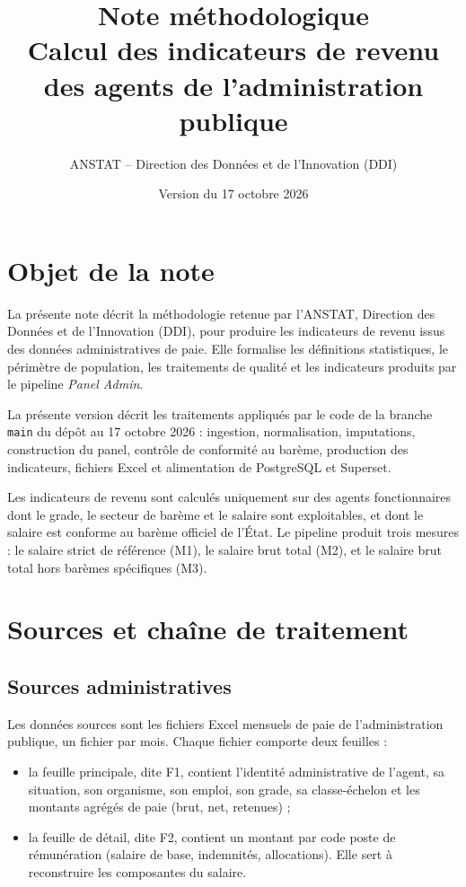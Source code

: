 \documentclass[12pt,a4paper,french]{article}
\title{Note méthodologique\\Calcul des indicateurs de revenu des agents de l'administration publique}
\author{ANSTAT -- Direction des Données et de l'Innovation (DDI)}
\date{Version du 17 octobre 2026}
\renewcommand{\_}{\underscoreorigine\allowbreak}
\begin{document}
\maketitle
\tableofcontents
\newpage

\section{Objet de la note}

La présente note décrit la méthodologie retenue par l'ANSTAT, Direction des Données et de l'Innovation (DDI), pour produire les indicateurs de revenu issus des données administratives de paie. Elle formalise les définitions statistiques, le périmètre de population, les traitements de qualité et les indicateurs produits par le pipeline \textit{Panel Admin}.

La présente version décrit les traitements appliqués par le code de la branche \texttt{main} du dépôt au 17 octobre 2026 : ingestion, normalisation, imputations, construction du panel, contrôle de conformité au barème, production des indicateurs, fichiers Excel et alimentation de PostgreSQL et Superset.

\begin{infobox}
Les indicateurs de revenu sont calculés uniquement sur des agents fonctionnaires dont le grade, le secteur de barème et le salaire sont exploitables, et dont le salaire est conforme au barème officiel de l'État. Le pipeline produit trois mesures : le salaire strict de référence (M1), le salaire brut total (M2), et le salaire brut total hors barèmes spécifiques (M3).
\end{infobox}

\section{Sources et chaîne de traitement}

\subsection{Sources administratives}

Les données sources sont les fichiers Excel mensuels de paie de l'administration publique, un fichier par mois. Chaque fichier comporte deux feuilles :

\begin{itemize}
    \item la feuille principale, dite F1, contient l'identité administrative de l'agent, sa situation, son organisme, son emploi, son grade, sa classe-échelon et les montants agrégés de paie (brut, net, retenues) ;
    \item la feuille de détail, dite F2, contient un montant par code poste de rémunération (salaire de base, indemnités, allocations). Elle sert à reconstruire les composantes du salaire.
\end{itemize}
\end{document}
